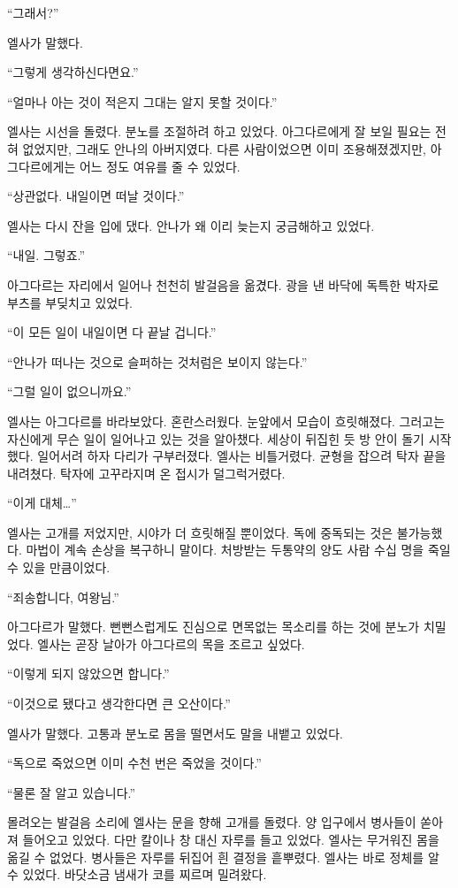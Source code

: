 ``그래서?''

엘사가 말했다.

``그렇게 생각하신다면요.''

``얼마나 아는 것이 적은지 그대는 알지 못할 것이다.''

엘사는 시선을 돌렸다. 분노를 조절하려 하고 있었다. 아그다르에게 잘 보일 필요는 전혀 없었지만, 그래도 안나의 아버지였다. 다른 사람이었으면 이미 조용해졌겠지만, 아그다르에게는 어느 정도 여유를 줄 수 있었다.

``상관없다. 내일이면 떠날 것이다.''

엘사는 다시 잔을 입에 댔다. 안나가 왜 이리 늦는지 궁금해하고 있었다.

``내일. 그렇죠.''

아그다르는 자리에서 일어나 천천히 발걸음을 옮겼다. 광을 낸 바닥에 독특한 박자로 부츠를 부딪치고 있었다.

``이 모든 일이 내일이면 다 끝날 겁니다.''

``안나가 떠나는 것으로 슬퍼하는 것처럼은 보이지 않는다.''

``그럴 일이 없으니까요.''

엘사는 아그다르를 바라보았다. 혼란스러웠다. 눈앞에서 모습이 흐릿해졌다. 그러고는 자신에게 무슨 일이 일어나고 있는 것을 알아챘다. 세상이 뒤집힌 듯 방 안이 돌기 시작했다. 일어서려 하자 다리가 구부러졌다. 엘사는 비틀거렸다. 균형을 잡으려 탁자 끝을 내려쳤다. 탁자에 고꾸라지며 온 접시가 덜그럭거렸다.

``이게 대체\ldots''

엘사는 고개를 저었지만, 시야가 더 흐릿해질 뿐이었다. 독에 중독되는 것은 불가능했다. 마법이 계속 손상을 복구하니 말이다. 처방받는 두통약의 양도 사람 수십 명을 죽일 수 있을 만큼이었다.

``죄송합니다, 여왕님.''

아그다르가 말했다. 뻔뻔스럽게도 진심으로 면목없는 목소리를 하는 것에 분노가 치밀었다. 엘사는 곧장 날아가 아그다르의 목을 조르고 싶었다.

``이렇게 되지 않았으면 합니다.''

``이것으로 됐다고 생각한다면 큰 오산이다.''

엘사가 말했다. 고통과 분노로 몸을 떨면서도 말을 내뱉고 있었다.

``독으로 죽었으면 이미 수천 번은 죽었을 것이다.''

``물론 잘 알고 있습니다.''

몰려오는 발걸음 소리에 엘사는 문을 향해 고개를 돌렸다. 양 입구에서 병사들이 쏟아져 들어오고 있었다. 다만 칼이나 창 대신 자루를 들고 있었다. 엘사는 무거워진 몸을 옮길 수 없었다. 병사들은 자루를 뒤집어 흰 결정을 흩뿌렸다. 엘사는 바로 정체를 알 수 있었다. 바닷소금 냄새가 코를 찌르며 밀려왔다.

